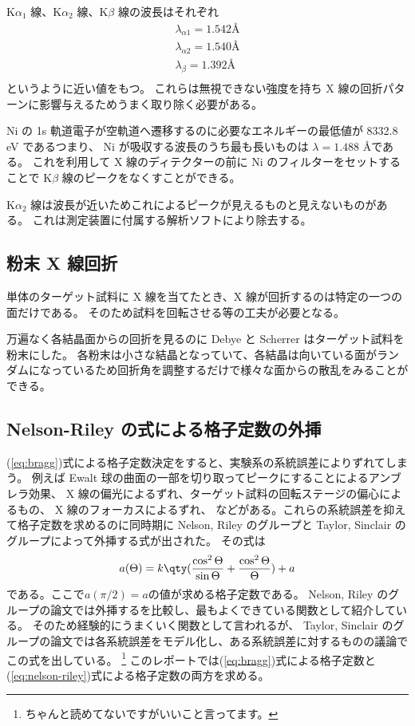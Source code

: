 \documentclass[11pt,dvipdfmx,a4paper]{jsarticle}
\begin{document}
K\(\alpha_1\) 線、K\(\alpha_2\) 線、K\(\beta\) 線の波長はそれぞれ
\begin{align}
	\lambda_{\alpha1} = 1.542 \text{\AA}\\
	\lambda_{\alpha2} = 1.540 \text{\AA}\\
	\lambda_{\beta} = 1.392 \text{\AA}\\
\end{align}
というように近い値をもつ。\cite{rikanenpyo}
これらは無視できない強度を持ち X 線の回折パターンに影響与えるためうまく取り除く必要がある。

Ni の 1s 軌道電子が空軌道へ遷移するのに必要なエネルギーの最低値が 8332.8 eV であるつまり、
Ni が吸収する波長のうち最も長いものは \(\lambda = 1.488\) \AA である。
これを利用して X 線のディテクターの前に Ni のフィルターをセットすることで K\(\beta\) 線のピークをなくすことができる。

K\(\alpha_2\) 線は波長が近いためこれによるピークが見えるものと見えないものがある。
これは測定装置に付属する解析ソフトにより除去する。

\subsection{粉末 X 線回折}
単体のターゲット試料に X 線を当てたとき、X 線が回折するのは特定の一つの面だけである。
そのため試料を回転させる等の工夫が必要となる。

万遍なく各結晶面からの回折を見るのに Debye と Scherrer はターゲット試料を粉末にした。
各粉末は小さな結晶となっていて、各結晶は向いている面がランダムになっているため回折角を調整するだけで様々な面からの散乱をみることができる。


\subsection{Nelson-Riley の式による格子定数の外挿}
(\ref{eq:bragg})式による格子定数決定をすると、実験系の系統誤差によりずれてしまう。
例えば Ewalt 球の曲面の一部を切り取ってピークにすることによるアンブレラ効果、
X 線の偏光によるずれ、ターゲット試料の回転ステージの偏心によるもの、
X 線のフォーカスによるずれ、
などがある。これらの系統誤差を抑えて格子定数を求めるのに同時期に Nelson, Riley のグループと
Taylor, Sinclair のグループによって外挿する式が出された。\cite{Nelson_1945}\cite{Taylor_1945}
その式は
\begin{align}
	a(\Theta) = k\qty(\frac{\cos^2\Theta}{\sin\Theta}+\frac{\cos^2\Theta}{\Theta}) + a \label{eq:nelson-riley}
\end{align}
である。ここで\(a(\pi/2)=a\)の値が求める格子定数である。
Nelson, Riley のグループの論文では外挿するを比較し、最もよくできている関数として紹介している。
そのため経験的にうまくいく関数として言われるが、
Taylor, Sinclair のグループの論文では各系統誤差をモデル化し、ある系統誤差に対するものの議論でこの式を出している。
\footnote{ちゃんと読めてないですがいいこと言ってます。}
このレポートでは(\ref{eq:bragg})式による格子定数と(\ref{eq:nelson-riley})式による格子定数の両方を求める。
\end{document}
